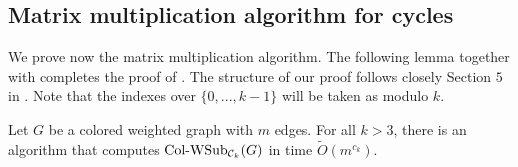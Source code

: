 \documentclass[a4paper,UKenglish,cleveref, autoref, numberwithinsect, thm-restate]{lipics-v2021}
\newcommand{\cycle}[1]{\cC_{#1}}
\newcommand{\WSub}[2]{\mathrm{\text{Col-WSub}}_{#2}(#1)}
\newcommand{\cC}{{\cal C}}
\begin{document}
	\subsection{Matrix multiplication algorithm for cycles}
	
		We prove now the matrix multiplication algorithm. The following lemma together with  completes the proof of . The structure of our proof follows closely Section $5$ in \cite{GiLeSh+23}. Note that the indexes over $\{0,...,k-1\}$ will be taken as modulo $k$.
		
		\begin{lemma} \label{lem:wsub_cycles_mm}
		Let $G$ be a colored weighted graph with $m$ edges. For all $k>3$, there is an algorithm that computes $\WSub{G}{\cycle{k}}$ in time $\tilde{O}(m^{c_k})$.
		\end{lemma}
\end{document}
